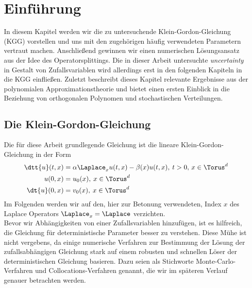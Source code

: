
\chapter{Einführung}
In diesem Kapitel werden wir die zu untersuchende Klein-Gordon-Gleichung (KGG) vorstellen und uns mit den zugehörigen häufig verwendeten Parametern vertraut machen. Anschließend gewinnen wir einen numerischen Lösungsansatz aus der Idee des Operatorsplittings. Die in dieser Arbeit untersuchte \emph{uncertainty} in Gestalt von Zufallsvariablen wird allerdings erst in den folgenden Kapiteln in die KGG einfließen. Zuletzt beschreibt dieses Kapitel relevante Ergebnisse aus der polynomialen Approximationstheorie und bietet einen ersten Einblick in die Beziehung von orthogonalen Polynomen und stochastischen Verteilungen.
\label{Chapter1}

\section{Die Klein-Gordon-Gleichung}
Die für diese Arbeit grundlegende Gleichung ist die lineare Klein-Gordon-Gleichung in der Form
\begin{align}
\label{kgg}
\dtt{u}(t,x)&=\alpha \Laplace_x u(t,x) - \beta(x)u(t,x), \: t>0, \, x\in \Torus^d\\
u(0,x)&=u_0(x), \: x\in \Torus^d\\
\dt{u}(0,x)&=v_0(x), \: x\in \Torus^d
\end{align}
Im Folgenden werden wir auf den, hier zur Betonung verwendeten, Index $x$ des Laplace Operators $\Laplace_x=\Laplace$ verzichten.\\
Bevor wir Abhängigkeiten von einer Zufallsvariablen hinzufügen, ist es hilfreich, die Gleichung für deterministische Parameter besser zu verstehen. Diese Mühe ist nicht vergebens, da einige numerische Verfahren zur Bestimmung der Lösung der zufallsabhängigen Gleichung stark auf einem robusten und schnellen Löser der deterministischen Gleichung basieren. Dazu seien als Stichworte Monte-Carlo-Verfahren und Collocations-Verfahren genannt, die wir im späteren Verlauf genauer betrachten werden.
